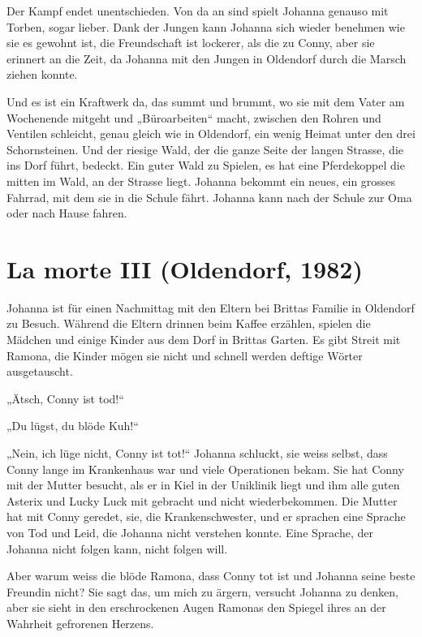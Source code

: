 \documentclass[10pt,titlepage,a5paper]{book}
\begin{document}
Der Kampf endet unentschieden. Von da an sind spielt Johanna genauso mit Torben, sogar lieber. Dank der Jungen kann Johanna sich wieder benehmen wie sie es gewohnt ist, die Freundschaft ist lockerer, als die zu Conny, aber sie erinnert an die Zeit, da Johanna mit den Jungen in Oldendorf durch die Marsch ziehen konnte.

 Und es ist ein Kraftwerk da, das summt und brummt, wo sie mit dem Vater am Wochenende mitgeht und „Büroarbeiten“ macht, zwischen den Rohren und Ventilen schleicht, genau gleich wie in Oldendorf, ein wenig Heimat unter den drei Schornsteinen.  Und der riesige Wald, der die ganze Seite der langen Strasse, die ins Dorf führt, bedeckt. Ein guter Wald zu Spielen, es hat eine Pferdekoppel die mitten im Wald, an der Strasse liegt.
Johanna bekommt ein neues, ein grosses Fahrrad, mit dem sie in die Schule fährt. Johanna kann nach der Schule zur Oma oder nach Hause fahren. 



\section*{La morte III (Oldendorf, 1982)}




Johanna ist für einen Nachmittag mit den Eltern bei Brittas Familie in Oldendorf zu Besuch. Während die Eltern drinnen beim Kaffee erzählen, spielen die Mädchen und einige Kinder aus dem Dorf in Brittas Garten. Es gibt Streit mit Ramona, die Kinder mögen sie nicht und schnell werden  deftige Wörter ausgetauscht.  

„Ätsch, Conny ist tod!“

„Du lügst, du blöde Kuh!“

„Nein, ich lüge nicht, Conny ist tot!“ Johanna schluckt, sie weiss selbst, dass Conny lange im Krankenhaus war und viele Operationen bekam. Sie hat Conny mit der Mutter besucht, als er in Kiel in der Uniklinik liegt und ihm alle guten Asterix und Lucky Luck mit gebracht und  nicht wiederbekommen. Die Mutter hat mit Conny geredet, sie, die Krankenschwester, und er sprachen eine Sprache von Tod und Leid, die Johanna nicht verstehen konnte. Eine Sprache, der Johanna nicht folgen kann, nicht folgen will.

Aber warum weiss die blöde Ramona, dass Conny tot ist und Johanna seine beste Freundin nicht? Sie sagt das, um mich zu ärgern, versucht  Johanna zu denken, aber sie sieht in den erschrockenen Augen Ramonas den Spiegel ihres an der Wahrheit gefrorenen Herzens.
\end{document}

